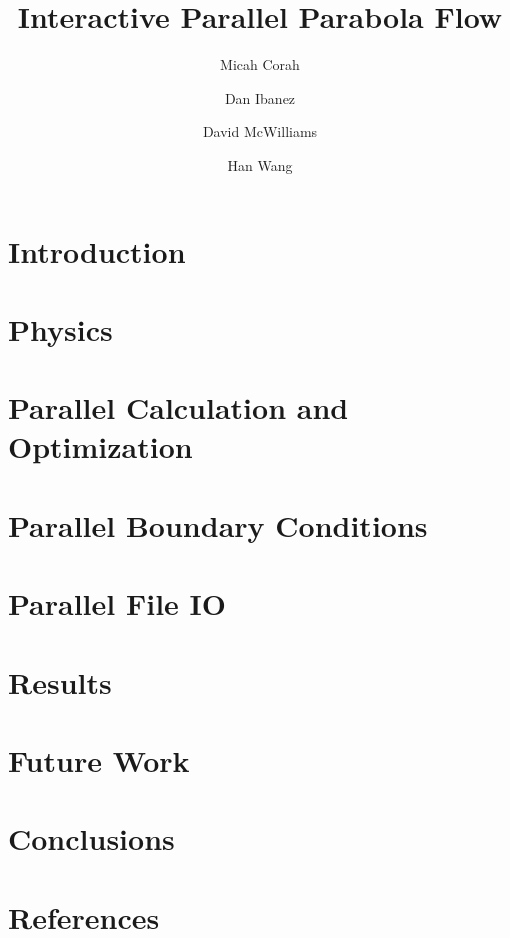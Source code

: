 \documentclass[twocolumn]{article}
\title{Interactive Parallel Parabola Flow}
\author{
Micah Corah
\and
Dan Ibanez
\and
David McWilliams
\and
Han Wang
}
\begin{document}
\maketitle
\section{Introduction}
\section{Physics}
\section{Parallel Calculation and Optimization}
\section{Parallel Boundary Conditions}
\section{Parallel File IO}
\section{Results}
\section{Future Work}
\section{Conclusions}
\section{References}
\end{document}
